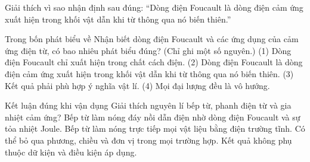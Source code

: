 \begin{bt}
Giải thích vì sao nhận định sau đúng: “Dòng điện Foucault là dòng điện cảm ứng xuất hiện trong khối vật dẫn khi từ thông qua nó biến thiên.”
\end{bt}

\begin{ex}
Trong bốn phát biểu về Nhận biết dòng điện Foucault và các ứng dụng của cảm ứng điện từ, có bao nhiêu phát biểu đúng? (Chỉ ghi một số nguyên.) (1) Dòng điện Foucault chỉ xuất hiện trong chất cách điện. (2) Dòng điện Foucault là dòng điện cảm ứng xuất hiện trong khối vật dẫn khi từ thông qua nó biến thiên. (3) Kết quả phải phù hợp ý nghĩa vật lí. (4) Mọi đại lượng đều là vô hướng.
\end{ex}

\begin{ex}
Kết luận đúng khi vận dụng Giải thích nguyên lí bếp từ, phanh điện từ và gia nhiệt cảm ứng?
\choice
{\True Bếp từ làm nóng đáy nồi dẫn điện nhờ dòng điện Foucault và sự tỏa nhiệt Joule.}
{Bếp từ làm nóng trực tiếp mọi vật liệu bằng điện trường tĩnh.}
{Có thể bỏ qua phương, chiều và đơn vị trong mọi trường hợp.}
{Kết quả không phụ thuộc dữ kiện và điều kiện áp dụng.}
\end{ex}

